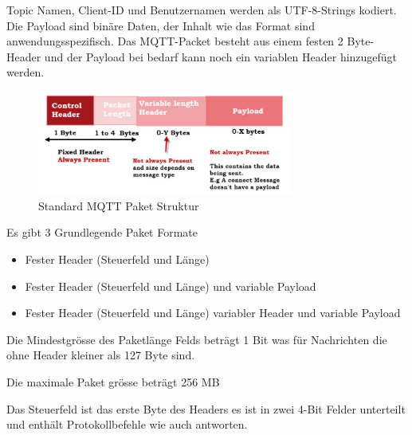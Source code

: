 Topic Namen, Client-ID und Benutzernamen werden als UTF-8-Strings kodiert. Die Payload sind binäre Daten, der Inhalt wie das Format sind anwendungsspezifisch. Das MQTT-Packet besteht aus einem festen 2 Byte-Header und der Payload bei bedarf kann noch ein variablen Header hinzugefügt werden.

\begin{figure}[H]
	\centering
	\includegraphics[width=0.75\textwidth]{graphics/MQTT-Standard-Packet.jpg}
	\caption{Standard MQTT Paket Struktur} 	
	\label{pic: Struktur}
\end{figure} 

Es gibt 3 Grundlegende Paket Formate

\begin{itemize}
	\item Fester Header (Steuerfeld und Länge)\\
	\item Fester Header (Steuerfeld und Länge) und variable Payload\\
	\item Fester Header (Steuerfeld und Länge) variabler Header und variable Payload\\
\end{itemize}

Die Mindestgrösse des Paketlänge Felds beträgt 1 Bit was für Nachrichten die ohne Header kleiner als 127 Byte sind. 

Die maximale Paket grösse beträgt 256 MB

Das Steuerfeld ist das erste Byte des Headers es ist in zwei 4-Bit Felder unterteilt und enthält Protokollbefehle wie auch antworten.